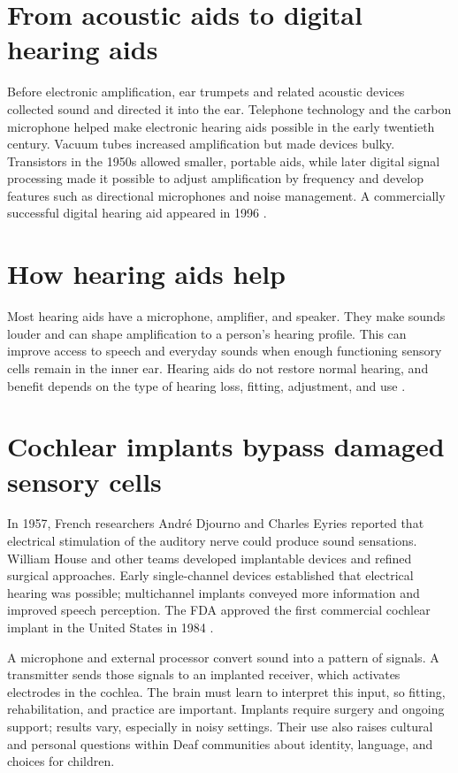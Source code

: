 \documentclass[12pt,oneside]{book}
\begin{document}
\section{From acoustic aids to digital hearing aids}
Before electronic amplification, ear trumpets and related acoustic devices
collected sound and directed it into the ear. Telephone technology and the
carbon microphone helped make electronic hearing aids possible in the early
twentieth century. Vacuum tubes increased amplification but made devices
bulky. Transistors in the 1950s allowed smaller, portable aids, while later
digital signal processing made it possible to adjust amplification by
frequency and develop features such as directional microphones and noise
management. A commercially successful digital hearing aid appeared in 1996
\cite{levittHearingAids2007}.

\section{How hearing aids help}
Most hearing aids have a microphone, amplifier, and speaker. They make sounds
louder and can shape amplification to a person's hearing profile. This can
improve access to speech and everyday sounds when enough functioning sensory
cells remain in the inner ear. Hearing aids do not restore normal hearing,
and benefit depends on the type of hearing loss, fitting, adjustment, and use
\cite{nidcdHearingAids}.

\section{Cochlear implants bypass damaged sensory cells}
In 1957, French researchers Andr\'e Djourno and Charles Eyries reported that
electrical stimulation of the auditory nerve could produce sound sensations.
William House and other teams developed implantable devices and refined
surgical approaches. Early single-channel devices established that electrical
hearing was possible; multichannel implants conveyed more information and
improved speech perception. The FDA approved the first commercial cochlear
implant in the United States in 1984 \cite{fdaCochlearImplant,cochlearHistory}.

A microphone and external processor convert sound into a pattern of signals.
A transmitter sends those signals to an implanted receiver, which activates
electrodes in the cochlea. The brain must learn to interpret this input, so
fitting, rehabilitation, and practice are important. Implants require surgery
and ongoing support; results vary, especially in noisy settings. Their use
also raises cultural and personal questions within Deaf communities about
identity, language, and choices for children.
\end{document}
